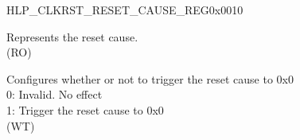 \begin{register}{H}{LP\_CLKRST\_RESET\_CAUSE\_REG}{0x0010}\label{regdesc:LPCLKRSTRESETCAUSEREG}
%
%
%
%
\regnewline%
\begin{regdesc}\begin{reglist}
\label{fielddesc:RTCCLKRSTRESETCAUSE}\item [RTC\_CLKRST\_RESET\_CAUSE] Represents the reset cause. \\ (RO)
\label{fielddesc:LPCLKRSTCORE0RESETCAUSECLR}\item [LP\_CLKRST\_CORE0\_RESET\_CAUSE\_CLR] Configures whether or not to trigger the reset cause to 0x0\\
0: Invalid. No effect \\
1: Trigger the reset cause to 0x0  \\ (WT)
\end{reglist}\end{regdesc}
\end{register}


